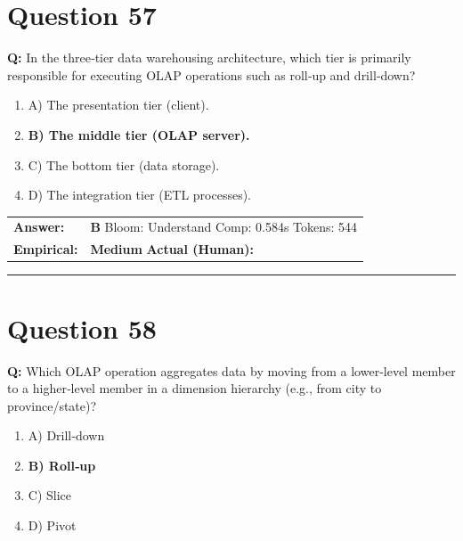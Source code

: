 \documentclass[9pt]{article}
\begin{document}
\section*{Question 57}

\textbf{Q:} In the three‑tier data warehousing architecture, which tier is primarily responsible for executing OLAP operations such as roll‑up and drill‑down?

\begin{enumerate}[label=\textbf{\alph{*})}, nosep]
    \item A) The presentation tier (client).
    \item \textbf{B) The middle tier (OLAP server).} %
    \item C) The bottom tier (data storage).
    \item D) The integration tier (ETL processes).

\end{enumerate}

\begin{tabular}{@{}l p{10.5cm}@{}}
\textbf{Answer:} & \textbf{B} \hspace{1em} Bloom: Understand \hspace{1em} Comp: 0.584s \hspace{1em} Tokens: 544 \\
\textbf{Empirical:} & \textbf{Medium} \hspace{1em} \textbf{Actual (Human):} \underline{\hspace{5cm}}
\end{tabular}

\vspace{0.2cm}
\rule{\textwidth}{0.4pt}
\vspace{0.2cm}


\section*{Question 58}

\textbf{Q:} Which OLAP operation aggregates data by moving from a lower‑level member to a higher‑level member in a dimension hierarchy (e.g., from city to province/state)?

\begin{enumerate}[label=\textbf{\alph{*})}, nosep]
    \item A) Drill‑down
    \item \textbf{B) Roll‑up} %
    \item C) Slice
    \item D) Pivot

\end{enumerate}
\end{document}
